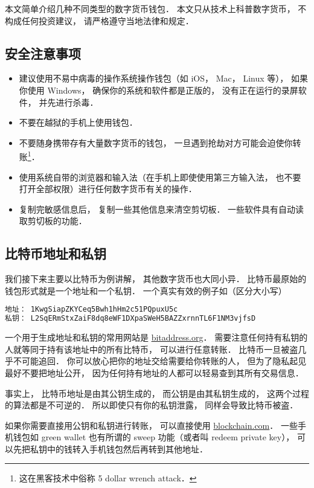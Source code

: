 
本文简单介绍几种不同类型的数字货币钱包． 本文只从技术上科普数字货币， 不构成任何投资建议， 请严格遵守当地法律和规定．

\subsection{安全注意事项}
\begin{itemize}
\item 建议使用不易中病毒的操作系统操作钱包（如 iOS， Mac， Linux 等）， 如果你使用 Windows， 确保你的系统和软件都是正版的， 没有正在运行的录屏软件， 并先进行杀毒．
\item 不要在越狱的手机上使用钱包．
\item 不要随身携带存有大量数字货币的钱包， 一旦遇到抢劫对方可能会迫使你转账\footnote{这在黑客技术中俗称 5 dollar wrench attack．}．
\item 使用系统自带的浏览器和输入法（在手机上即使使用第三方输入法， 也不要打开全部权限）进行任何数字货币有关的操作．
\item 复制完敏感信息后， 复制一些其他信息来清空剪切板． 一些软件具有自动读取剪切板的功能．
\end{itemize}

\subsection{比特币地址和私钥}
我们接下来主要以比特币为例讲解， 其他数字货币也大同小异． 比特币最原始的钱包形式就是一个地址和一个私钥． 一个真实有效的例子如（区分大小写）
\begin{lstlisting}[language=bash]
地址： 1KwgSiapZKYCeq5Bwh1hHm2c51PQpuxU5c
私钥： L2SqERmStxZaiF8dq8eWF1DXpaSWeH5BAZZxrnnTL6F1NM3vjfsD
\end{lstlisting}
一个用于生成地址和私钥的常用网站是 \href{https://www.bitaddress.org/}{bitaddress.org}． 需要注意任何持有私钥的人就等同于持有该地址中的所有比特币， 可以进行任意转账． 比特币一旦被盗几乎不可能追回． 你可以放心把你的地址交给需要给你转账的人， 但为了隐私起见最好不要把地址公开， 因为任何持有地址的人都可以轻易查到其所有交易信息．

事实上， 比特币地址是由其公钥生成的， 而公钥是由其私钥生成的， 这两个过程的算法都是不可逆的． 所以即使只有你的私钥泄露， 同样会导致比特币被盗．

如果你需要直接用公钥和私钥进行转账， 可以直接使用 \href{https://blockchain.com}{blockchain.com}． 一些手机钱包如 green wallet 也有所谓的 sweep 功能（或者叫 redeem private key）， 可以先把私钥中的钱转入手机钱包然后再转到其他地址．

